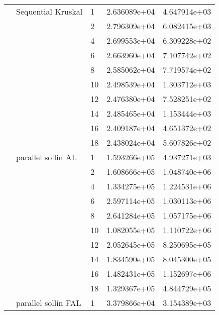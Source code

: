 \begin{tabular}{lllrr}
                      & Sequential Kruskal & 1  &  2.636089e+04 &  4.647914e+03 \\
                      &                     & 2  &  2.796309e+04 &  6.082415e+03 \\
                      &                     & 4  &  2.699553e+04 &  6.309228e+02 \\
                      &                     & 6  &  2.663960e+04 &  7.107742e+02 \\
                      &                     & 8  &  2.585062e+04 &  7.719574e+02 \\
                      &                     & 10 &  2.498539e+04 &  1.303712e+03 \\
                      &                     & 12 &  2.476380e+04 &  7.528251e+02 \\
                      &                     & 14 &  2.485465e+04 &  1.153444e+03 \\
                      &                     & 16 &  2.409187e+04 &  4.651372e+02 \\
                      &                     & 18 &  2.438024e+04 &  5.607826e+02 \\
                      & parallel sollin AL & 1  &  1.593266e+05 &  4.937271e+03 \\
                      &                     & 2  &  1.608666e+05 &  1.048740e+06 \\
                      &                     & 4  &  1.334275e+05 &  1.224531e+06 \\
                      &                     & 6  &  2.597114e+05 &  1.030113e+06 \\
                      &                     & 8  &  2.641284e+05 &  1.057175e+06 \\
                      &                     & 10 &  1.082055e+05 &  1.110722e+06 \\
                      &                     & 12 &  2.052645e+05 &  8.250695e+05 \\
                      &                     & 14 &  1.834590e+05 &  8.045300e+05 \\
                      &                     & 16 &  1.482431e+05 &  1.152697e+06 \\
                      &                     & 18 &  1.329367e+05 &  4.844729e+05 \\
                      & parallel sollin FAL & 1  &  3.379866e+04 &  3.154389e+03 \\

\end{tabular}
